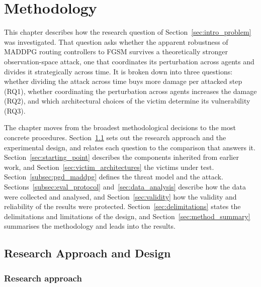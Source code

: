 
%

\chapter{Methodology}
\label{cha:methodology}

This chapter describes how the research question of Section~\ref{sec:intro_problem} was
investigated. That question asks whether the apparent robustness of MADDPG routing
controllers to FGSM survives a theoretically stronger observation-space attack, one that
coordinates its perturbation across agents and divides it strategically across time. It
is broken down
into three questions: whether dividing the attack across time buys more damage per
attacked step (RQ1), whether coordinating the perturbation across agents increases the
damage (RQ2), and which architectural choices of the victim determine its vulnerability
(RQ3).

The chapter moves from the broadest methodological decisions to the most concrete
procedures. Section~\ref{sec:research_design} sets out the research approach and the
experimental design, and relates each question to the comparison that answers it.
Section~\ref{sec:starting_point} describes the components inherited from earlier work,
and Section~\ref{sec:victim_architectures} the victims under test.
Section~\ref{subsec:pgd_maddpg} defines the threat model and the attack.
Sections~\ref{subsec:eval_protocol} and~\ref{sec:data_analysis} describe how the data
were collected and analysed, and Section~\ref{sec:validity} how the validity and
reliability of the results were protected. Section~\ref{sec:delimitations} states the
delimitations and limitations of the design, and Section~\ref{sec:method_summary}
summarises the methodology and leads into the results.

\section{Research Approach and Design}
\label{sec:research_design}

\subsection{Research approach}
\label{subsec:research_approach}

